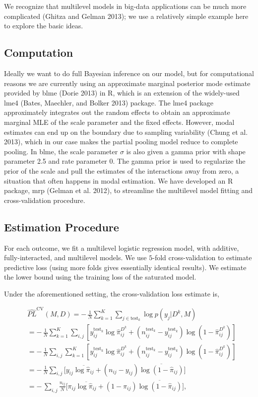 We recognize that multilevel models in big-data applications can be much
more complicated (Ghitza and Gelman 2013); we use a relatively simple
example here to explore the basic ideas.

\subsection{Computation}\label{computation}

Ideally we want to do full Bayesian inference on our model, but for
computational reasons we are currently using an approximate marginal
posterior mode estimate provided by blme (Dorie 2013) in R, which is an
extension of the widely-used lme4 (Bates, Maechler, and Bolker 2013)
package. The lme4 package approximately integrates out the random
effects to obtain an approximate marginal MLE of the scale parameter and
the fixed effects. However, modal estimates can end up on the boundary
due to sampling variability (Chung et al. 2013), which in our case makes
the partial pooling model reduce to complete pooling. In blme, the scale
parameter \(\sigma\) is also given a gamma prior with shape parameter
2.5 and rate parameter 0. The gamma prior is used to regularize the
prior of the scale and pull the estimates of the interactions away from
zero, a situation that often happens in modal estimation. We have
developed an R package, mrp (Gelman et al. 2012), to streamline the
multilevel model fitting and cross-validation procedure.

\subsection{Estimation Procedure}\label{estimation-procedure}

For each outcome, we fit a multilevel logistic regression model, with
additive, fully-interacted, and multilevel models. We use \(5\)-fold
cross-validation to estimate predictive loss (using more folds gives
essentially identical results). We estimate the lower bound using the
training loss of the saturated model.

Under the aforementioned setting, the cross-validation loss estimate is,

\begin{align*}
  \label{eq:CV4MultiWaySurvey}
  &\widehat{PL}^{\text{CV}}(M, D) =-\,\frac{1}{N}\sum_{k=1}^K\sum_{j\in \text{test}_k}\log p(y_j|D^k, M)\\
  & = -\,\frac{1}{N}\sum_{k=1}^K\sum_{i,j} [y^{\text{test}_k}_{ij}\log\hat\pi_{ij}^{D^k}+(n^{\text{test}_k}_{ij}- y^{\text{test}_k}_{ij})\log(1-\hat\pi_{ij}^{D^k})]\\
  & = -\,\frac{1}{N}\sum_{i,j}\sum_{k=1}^K[ y^{\text{test}_k}_{ij}\log\hat\pi_{ij}^{D^k}+(n^{\text{test}_k}_{ij}- y^{\text{test}_k}_{ij})\log(1-\hat\pi_{ij}^{D^k})]\\
  & = -\,\frac{1}{N}\sum_{i,j}\big[y_{ij}\overline{\log\hat{\pi}_{ij}} +(n_{ij}- y_{ij})\overline{\log(1-\hat\pi_{ij})}\big]\\
  & = -\,\sum_{i,j}\frac{n_{ij}}{N}\big[\pi_{ij}\overline{\log\hat\pi_{ij}} +(1- \pi_{ij})\overline{\log(1-\hat\pi_{ij})}\big],
\end{align*}

